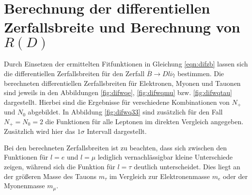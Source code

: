 \section{Berechnung der differentiellen Zerfallsbreite und Berechnung von \texorpdfstring{$R(D)$}{R(D)}}
Durch Einsetzen der ermittelten Fitfunktionen in Gleichung \eqref{eqn:difzb} lassen sich die differentiellen Zerfallsbreiten für den Zerfall $\overline{B} \to D l \overline{\nu}_l$ bestimmen.
Die berechneten differentiellen Zerfallsbreiten für Elektronen, Myonen und Tauonen sind jeweils in den Abbildungen \ref{fig:difwqe}, \ref{fig:difwqmu} bzw. \ref{fig:difwqtau} dargestellt.
Hierbei sind die Ergebnisse für verschiedene Kombinationen von $N_+$ und $N_0$ abgebildet.
In Abbildung \ref{fig:difwq33} sind zusätzlich für den Fall $N_+=N_0=\num{2}$ die Funktionen für alle Leptonen im direkten Vergleich angegeben.
Zusätzlich wird hier das $\num{1}\sigma$ Intervall dargestellt.

Bei den berechneten Zerfallsbreiten ist zu beachten, dass sich zwischen den Funktionen für $l = e$ und $l = \mu$ lediglich vernachlässigbar kleine Unterschiede zeigen, während sich die Funktion für $l = \tau$ deutlich unterscheidet.
Dies liegt an der größeren Masse des Tauons $m_{\tau}$ im Vergleich zur Elektronenmasse $m_{e}$ oder der Myonenmasse $m_{\mu}$.

